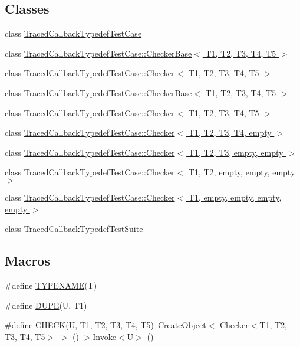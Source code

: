 \subsection*{Classes}
\begin{DoxyCompactItemize}
\item 
class \hyperlink{classTracedCallbackTypedefTestCase}{Traced\+Callback\+Typedef\+Test\+Case}
\item 
class \hyperlink{classTracedCallbackTypedefTestCase_1_1CheckerBase}{Traced\+Callback\+Typedef\+Test\+Case\+::\+Checker\+Base$<$ T1, T2, T3, T4, T5 $>$}
\item 
class \hyperlink{classTracedCallbackTypedefTestCase_1_1Checker}{Traced\+Callback\+Typedef\+Test\+Case\+::\+Checker$<$ T1, T2, T3, T4, T5 $>$}
\item 
class \hyperlink{classTracedCallbackTypedefTestCase_1_1CheckerBase}{Traced\+Callback\+Typedef\+Test\+Case\+::\+Checker\+Base$<$ T1, T2, T3, T4, T5 $>$}
\item 
class \hyperlink{classTracedCallbackTypedefTestCase_1_1Checker}{Traced\+Callback\+Typedef\+Test\+Case\+::\+Checker$<$ T1, T2, T3, T4, T5 $>$}
\item 
class \hyperlink{classTracedCallbackTypedefTestCase_1_1Checker_3_01T1_00_01T2_00_01T3_00_01T4_00_01empty_01_4}{Traced\+Callback\+Typedef\+Test\+Case\+::\+Checker$<$ T1, T2, T3, T4, empty $>$}
\item 
class \hyperlink{classTracedCallbackTypedefTestCase_1_1Checker_3_01T1_00_01T2_00_01T3_00_01empty_00_01empty_01_4}{Traced\+Callback\+Typedef\+Test\+Case\+::\+Checker$<$ T1, T2, T3, empty, empty $>$}
\item 
class \hyperlink{classTracedCallbackTypedefTestCase_1_1Checker_3_01T1_00_01T2_00_01empty_00_01empty_00_01empty_01_4}{Traced\+Callback\+Typedef\+Test\+Case\+::\+Checker$<$ T1, T2, empty, empty, empty $>$}
\item 
class \hyperlink{classTracedCallbackTypedefTestCase_1_1Checker_3_01T1_00_01empty_00_01empty_00_01empty_00_01empty_01_4}{Traced\+Callback\+Typedef\+Test\+Case\+::\+Checker$<$ T1, empty, empty, empty, empty $>$}
\item 
class \hyperlink{classTracedCallbackTypedefTestSuite}{Traced\+Callback\+Typedef\+Test\+Suite}
\end{DoxyCompactItemize}
\subsection*{Macros}
\begin{DoxyCompactItemize}
\item 
\#define \hyperlink{traced-callback-typedef-test-suite_8cc_abc5a85cfef5c49b7e8083d02984cbe8d}{T\+Y\+P\+E\+N\+A\+ME}(T)
\item 
\#define \hyperlink{traced-callback-typedef-test-suite_8cc_a50f6941ad15ebf54b093e7a2faf9a3f9}{D\+U\+PE}(U,  T1)
\item 
\#define \hyperlink{traced-callback-typedef-test-suite_8cc_aa79806eee113005f96d9d3cb1480ce98}{C\+H\+E\+CK}(U,  T1,  T2,  T3,  T4,  T5)~Create\+Object$<$ Checker$<$T1, T2, T3, T4, T5$>$ $>$ ()-\/$>$Invoke$<$U$>$ ()
\end{DoxyCompactItemize}
